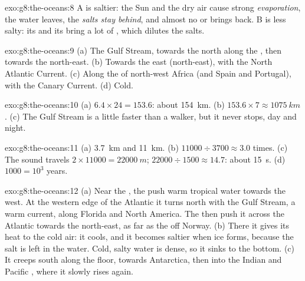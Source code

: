 \begin{solution}{exo:g8:the-oceans:8}
 A is saltier: the Sun and the dry air cause strong
\emph{evaporation}, the water leaves, the \emph{salts stay behind}, and
almost no  or  brings \emph{} back.  B is less
salty: its  and its  bring a lot of \emph{}, which
dilutes the salts.
\end{solution}

\begin{solution}{exo:g8:the-oceans:9}
(a) The Gulf Stream, towards the north along the , then towards the
north-east. (b) Towards the east (north-east), with the North Atlantic
Current. (c) Along the  of north-west Africa (and Spain and
Portugal), with the Canary Current. (d) Cold.
\end{solution}

\begin{solution}{exo:g8:the-oceans:10}
(a) $6.4 \times 24 = 153.6$: about \qty{154}{km}. (b) $153.6 \times 7
\approx \qty{1075}{km}$. (c) The Gulf Stream is a little faster than a
walker, but it never stops, day and night.
\end{solution}

\begin{solution}{exo:g8:the-oceans:11}
(a) \qty{3.7}{km} and \qty{11}{km}. (b) $11000 \div 3700 \approx 3.0$
times. (c) The sound travels $2 \times 11000 = \qty{22000}{m}$; $22000
\div 1500 \approx 14.7$: about \qty{15}{s}. (d) $1000 = 10^3$ years.
\end{solution}

\begin{solution}{exo:g8:the-oceans:12}
(a) Near the , the  push warm tropical water towards the
west. At the western edge of the Atlantic it turns north with the Gulf
Stream, a warm current, along Florida and North America. The 
then push it across the Atlantic towards the north-east, as far as the
 off Norway. (b) There it gives its heat to the cold air: it cools,
and it becomes saltier when  ice forms, because the salt is left in
the water. Cold, salty water is dense, so it sinks to the bottom. (c) It
creeps south along the  floor, towards Antarctica, then into the
Indian and Pacific , where it slowly rises again.
\end{solution}

